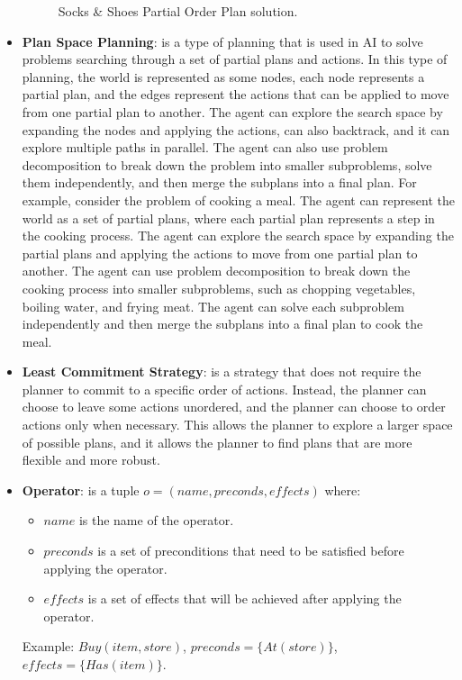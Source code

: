 \begin{itemize}
\begin{figure}[ht]
              \caption{Socks \& Shoes Partial Order Plan solution.}
              \label{fig:socks_shoes_partial_order_plan}
          \end{figure}
    \item \label{def:plan_space_planning}
          \textbf{Plan Space Planning}: is a type of planning that is used in \ac{AI} to solve problems searching through a set of partial plans and actions. In this type of planning, the world is represented as some nodes, each node represents a partial plan, and the edges represent the actions that can be applied to move from one partial plan to another. The agent can explore the search space by expanding the nodes and applying the actions, can also backtrack, and it can explore multiple paths in parallel. The agent can also use problem decomposition to break down the problem into smaller subproblems, solve them independently, and then merge the subplans into a final plan. For example, consider the problem of cooking a meal. The agent can represent the world as a set of partial plans, where each partial plan represents a step in the cooking process. The agent can explore the search space by expanding the partial plans and applying the actions to move from one partial plan to another. The agent can use problem decomposition to break down the cooking process into smaller subproblems, such as chopping vegetables, boiling water, and frying meat. The agent can solve each subproblem independently and then merge the subplans into a final plan to cook the meal.

    \item \label{def:least_commitment_strategy}
          \textbf{Least Commitment Strategy}: is a strategy that does not require the planner to commit to a specific order of actions. Instead, the planner can choose to leave some actions unordered, and the planner can choose to order actions only when necessary. This allows the planner to explore a larger space of possible plans, and it allows the planner to find plans that are more flexible and more robust.

    \item \label{def:operator}
          \textbf{Operator}: is a tuple $o = (name, preconds, effects)$ where:
          \begin{itemize}
              \item $name$ is the name of the operator.
              \item $preconds$ is a set of preconditions that need to be satisfied before applying the operator.
              \item $effects$ is a set of effects that will be achieved after applying the operator.
          \end{itemize}
          Example: $Buy(item,store)$, $preconds = \{At(store)\}$, $effects = \{Has(item)\}$.


\end{itemize}
